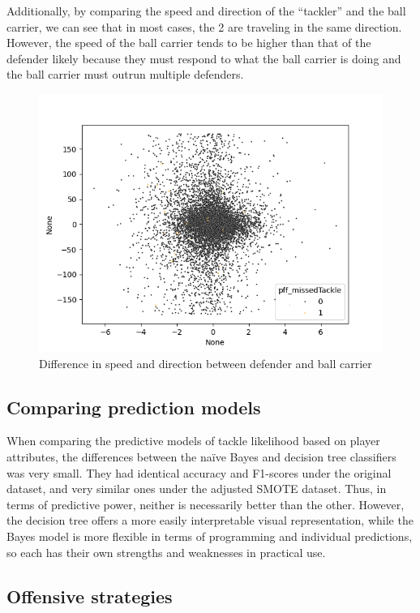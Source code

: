 \documentclass[bibtex, sigconf, hyperref={colorlinks=true,linkcolor=blue,urlcolor=blue}]{acmart}
\begin{document}
Additionally, by comparing the speed and direction of the ``tackler'' and the
ball carrier, we can see that in most cases, the 2 are traveling in the same
direction. However, the speed of the ball carrier tends to be higher than that
of the defender likely because they must respond to what the ball carrier is
doing and the ball carrier must outrun multiple defenders.
\begin{figure}[h]
  \centering
  \includegraphics[width=\linewidth]{speed}
  \caption{Difference in speed and direction between defender and ball carrier}
\end{figure}

\subsection{Comparing prediction models}

When comparing the predictive models of tackle likelihood based on player
attributes, the differences between the na\"ive Bayes and decision tree
classifiers was very small. They had identical accuracy and F1-scores under the
original dataset, and very similar ones under the adjusted SMOTE dataset.
Thus, in terms of predictive power, neither is necessarily better than the
other. However, the decision tree offers a more easily interpretable visual
representation, while the Bayes model is more flexible in terms of programming
and individual predictions, so each has their own strengths and weaknesses in
practical use.

\subsection{Offensive strategies}
\end{document}
